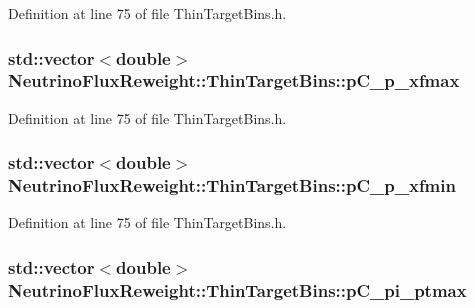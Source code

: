 Definition at line 75 of file Thin\-Target\-Bins.\-h.

\hypertarget{class_neutrino_flux_reweight_1_1_thin_target_bins_aa3fb21c1755a0a90c287f02b53d46d8d}{
\subsubsection[{p\-C\-\_\-p\-\_\-xfmax}]{\setlength{\rightskip}{0pt plus 5cm}std\-::vector$<$double$>$ Neutrino\-Flux\-Reweight\-::\-Thin\-Target\-Bins\-::p\-C\-\_\-p\-\_\-xfmax}}\label{class_neutrino_flux_reweight_1_1_thin_target_bins_aa3fb21c1755a0a90c287f02b53d46d8d}


Definition at line 75 of file Thin\-Target\-Bins.\-h.

\hypertarget{class_neutrino_flux_reweight_1_1_thin_target_bins_a7571e704cfcc31b7dc5859aaaa1a6c4b}{
\subsubsection[{p\-C\-\_\-p\-\_\-xfmin}]{\setlength{\rightskip}{0pt plus 5cm}std\-::vector$<$double$>$ Neutrino\-Flux\-Reweight\-::\-Thin\-Target\-Bins\-::p\-C\-\_\-p\-\_\-xfmin}}\label{class_neutrino_flux_reweight_1_1_thin_target_bins_a7571e704cfcc31b7dc5859aaaa1a6c4b}


Definition at line 75 of file Thin\-Target\-Bins.\-h.

\hypertarget{class_neutrino_flux_reweight_1_1_thin_target_bins_a1e80cc8c9297c568dcf389a5ceb11e78}{
\subsubsection[{p\-C\-\_\-pi\-\_\-ptmax}]{\setlength{\rightskip}{0pt plus 5cm}std\-::vector$<$double$>$ Neutrino\-Flux\-Reweight\-::\-Thin\-Target\-Bins\-::p\-C\-\_\-pi\-\_\-ptmax}}\label{class_neutrino_flux_reweight_1_1_thin_target_bins_a1e80cc8c9297c568dcf389a5ceb11e78}


